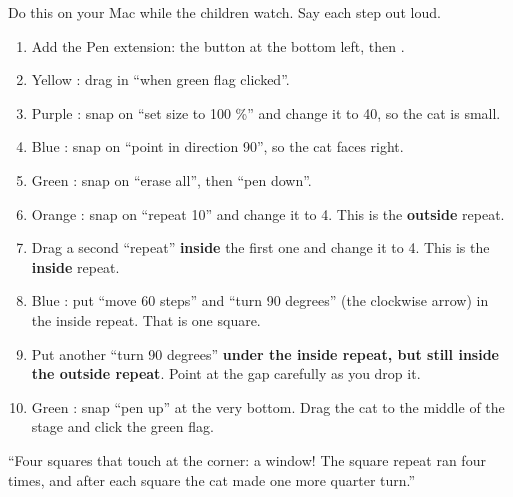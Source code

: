 \begin{workedexample}
Do this on your Mac while the children watch. Say each step out loud.
\begin{enumerate}[leftmargin=1.4em,itemsep=1pt]
  \item Add the Pen extension: the  button at the bottom left, then .
  \item Yellow : drag in \enquote{when green flag clicked}.
  \item Purple : snap on \enquote{set size to 100 \%} and change it to 40, so the cat is small.
  \item Blue : snap on \enquote{point in direction 90}, so the cat faces right.
  \item Green : snap on \enquote{erase all}, then \enquote{pen down}.
  \item Orange : snap on \enquote{repeat 10} and change it to 4. This is the \textbf{outside} repeat.
  \item Drag a second \enquote{repeat} \textbf{inside} the first one and change it to 4. This is the \textbf{inside} repeat.
  \item Blue : put \enquote{move 60 steps} and \enquote{turn 90 degrees} (the clockwise arrow) in the inside repeat. That is one square.
  \item Put another \enquote{turn 90 degrees} \textbf{under the inside repeat, but still inside the outside repeat}. Point at the gap carefully as you drop it.
  \item Green : snap \enquote{pen up} at the very bottom. Drag the cat to the middle of the stage and click the green flag.
\end{enumerate}
\enquote{Four squares that touch at the corner: a window! The square repeat ran four times, and after each square the cat made one more quarter turn.}
\begin{center}
\begin{scratch}[scale=0.85]
\end{scratch}
\end{center}
\end{workedexample}

